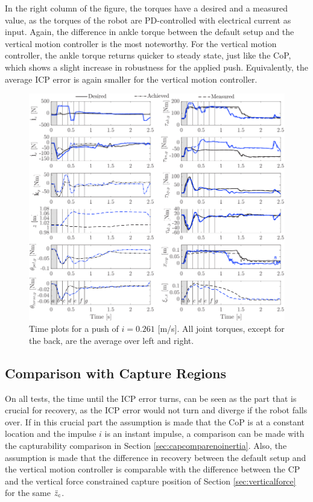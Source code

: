 In the right column of the figure, the torques have a desired and a measured value, as the torques of the robot are PD-controlled with electrical current as input. Again, the difference in ankle torque between the default setup and the vertical motion controller is the most noteworthy. For the vertical motion controller, the ankle torque returns quicker to steady state, just like the \ac{CoP}, which shows a slight increase in robustness for the applied push. Equivalently, the average \ac{ICP} error is again smaller for the vertical motion controller.
\begin{figure}[h]
\centering
\includegraphics[width=1.0\textwidth]{STYLESTUFF/valcomparetimeHW.png}
\caption{Time plots for a push of $i=0.261$ [m/s]. All joint torques, except for the back, are the average over left and right.}
\label{fig:valcomparetimeHW}
\end{figure}


\subsection{Comparison with Capture Regions}
On all tests, the time until the \ac{ICP} error turns, can be seen as the part that is crucial for recovery, as the \ac{ICP} error would not turn and diverge if the robot falls over. If in this crucial part the assumption is made that the \ac{CoP} is at a constant location and the impulse $i$ is an instant impulse, a comparison can be made with the capturability comparison in Section \ref{sec:capcomparenoinertia}. Also, the assumption is made that the difference in recovery between the default setup and the vertical motion controller is comparable with the difference between the \ac{CP} and the vertical force constrained capture position of Section \ref{sec:verticalforce} for the same $\ddot{z}_{c}$.

